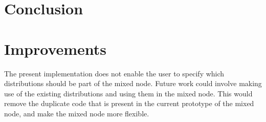 \documentclass[10pt, conference, compsocconf,a4paper]{IEEEtran}
\begin{document}
\section{Conclusion} %
\label{sec:conclusion}


\section{Improvements} %
\label{sec:improvements}
The present implementation does not enable the user to specify which distributions should be part of the mixed node. Future work could involve making use of the existing distributions and using them in the mixed node. This would remove the duplicate code that is present in the current prototype of the mixed node, and make the mixed node more flexible.



\end{document}
